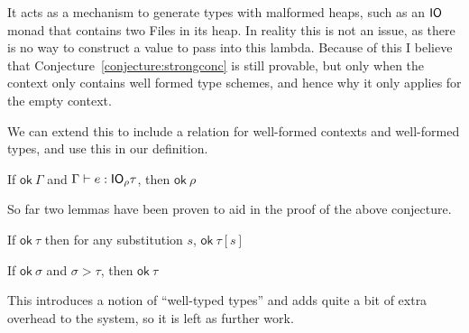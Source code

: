 It acts as a mechanism to generate types with malformed heaps, such as
an $\mathsf{IO}$ monad that contains two \textsf{File}s in its heap.  In
reality this is not an issue, as there is no way to construct a value
to pass into this lambda. Because of this I believe that Conjecture~\ref{conjecture:strongconc} is still
provable, but only when the context only contains well formed type
schemes, and hence why it only applies for the empty context.

We can extend this to include a relation for well-formed contexts and
well-formed types, and use this in our definition. 


\begin{conjecture}
  If $\textsf{ok} \ \Gamma$ and $\Gamma \vdash e : \mathsf{IO}_\rho \tau$, then $\textsf{ok} \ \rho$
\end{conjecture}
So far two lemmas have been proven to aid in the proof of the above
conjecture.
\begin{lemma}
  If $\textsf{ok} \ \tau$ then for any substitution $s$, $\textsf{ok} \ \tau[s]$
\end{lemma}
\begin{lemma}
  If $\textsf{ok} \ \sigma$ and $\sigma > \tau$, then $\textsf{ok} \ \tau$
\end{lemma}

This introduces a notion of ``well-typed types'' and adds quite a bit
of extra overhead to the system, so it is left as further work.

